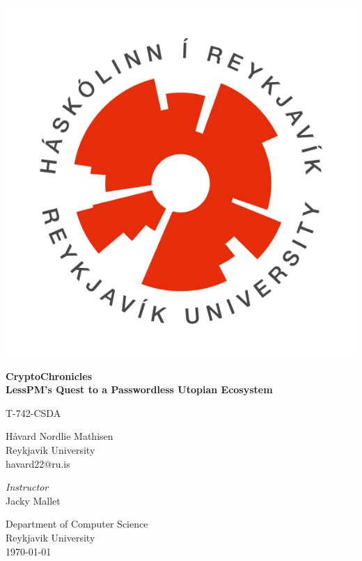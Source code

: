 \documentclass[twocolumn]{article}
\title{\titleHeading}
\author{Håvard Nordlie Mathisen}
\date{January, 2023}
\newcommand{\jacky}{Jacky Mallet}
\newcommand{\secu}{T-742-CSDA}
\newcommand{\titleHeading}{CryptoChronicles}
\newcommand{\titleSubheading}{LessPM's Quest to a Passwordless Utopian Ecosystem}
\newcommand{\subjectName}{\secu}
\newcommand{\instructorName}{\jacky}
\begin{document}
    \begin{titlepage}
        \begin{center}
            \includegraphics[scale=0.4]{images/HR_logo_hringur_transparent}

            \huge
            \textbf{\titleHeading}\\
            \Large
            \textbf{\titleSubheading}

            \vspace{1cm}
            \large
            \subjectName

            \vspace{0.5cm}
            \Large
            Håvard Nordlie Mathisen\\
            \large
            Reykjavik University\\
            havard22@ru.is


            \vfill

            \normalsize
            \textit{Instructor}\\
            \instructorName

            \vspace{0.8cm}

            Department of Computer Science\\
            Reykjavik University\\
            \today\\

        \end{center}
    \end{titlepage}
\end{document}
